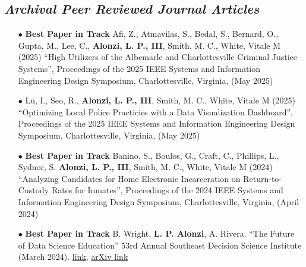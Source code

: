 \documentclass{article}[10pt]
\begin{document}
\subsection*{\emph{Archival Peer Reviewed Journal Articles}}
\begin{itemize}

\item [$\bullet$] {\bf \LARGE Best Paper in Track} Afi, Z., Atmavilas, S., Bedal, S., Bernard, O., Gupta, M., Lee, C., {\bf Alonzi, L. P., III}, Smith, M. C., White, Vitale M (2025) “High Utilizers of the Albemarle and Charlottesville Criminal Justice Systems”, Proceedings of the 2025 IEEE Systems and Information Engineering Design Symposium, Charlottesville, Virginia, (May 2025)

\item [$\bullet$] Lu, I., Seo, R., {\bf Alonzi, L. P., III}, Smith, M. C., White, Vitale M (2025) “Optimizing Local Police Practicies with a Data Visualization Dashboard”, Proceedings of the 2025 IEEE Systems and Information Engineering Design Symposium, Charlottesville, Virginia, (May 2025)

\item [$\bullet$] {\bf \LARGE Best Paper in Track} Banino, S., Boulos, G., Craft, C., Phillips, L., Sydnor, S. {\bf Alonzi, L. P., III}, Smith, M. C., White, Vitale M (2024) “Analyzing Candidates for Home Electronic Incarceration on Return-to-Custody Rates for Inmates”, Proceedings of the 2024 IEEE Systems and Information Engineering Design Symposium, Charlottesville, Virginia, (April 2024)

\item [$\bullet$] {\bf \LARGE Best Paper in Track} B. Wright, {\bf L. P. Alonzi}, A. Rivera. “The Future of Data Science Education” 53rd Annual Southeast Decision Science Institute (March 2024). \href{https://sedsi.decisionsciences.org/wp-content/uploads/sites/7/2024/08/SEDSI-2024-Proceedings-2.pdf}{link}, \href{https://arxiv.org/abs/2407.11824.}{arXiv link}


\end{itemize}
\end{document}
